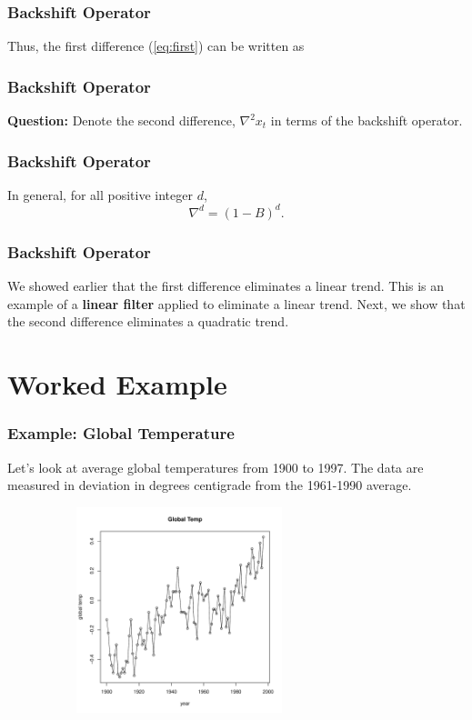 \documentclass[%
xcolor=pdftex]{beamer}
\begin{document}
\begin{frame}
\frametitle{Backshift Operator}

Thus, the first difference (\ref{eq:first}) can be written as

\vspace{50mm}

\end{frame}

\begin{frame}
\frametitle{Backshift Operator}

\textbf{Question:} Denote the second difference, $\nabla^2 x_t$ in terms of the backshift operator.

\vspace{50mm}

\end{frame}

\begin{frame}
\frametitle{Backshift Operator}

In general, for all positive integer $d$,
\begin{equation}
\nabla^d = (1-B)^d.
\end{equation}

\end{frame}

\begin{frame}
\frametitle{Backshift Operator}

We showed earlier that the first difference eliminates a linear trend. This is an example of a \textbf{linear filter} applied to eliminate a linear trend. Next, we show that the second difference eliminates a quadratic trend.

\vspace{50mm}

\end{frame}

\section{Worked Example}
\frame{\tableofcontents[currentsection]}

\begin{frame}
\frametitle{Example: Global Temperature}

Let's look at average global temperatures from 1900 to 1997. The data are measured in deviation in degrees centigrade from the 1961-1990 average.

\includegraphics[width=100mm, height=60mm]{pics/plots1.pdf}

\end{frame}
\end{document}
